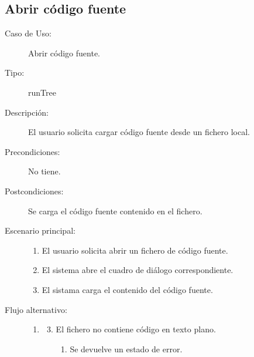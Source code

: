 \subsection{Abrir código fuente} 
\begin{framed}
\FloatBarrier
\begin{description}
   \item[Caso de Uso:] Abrir código fuente.
   \item [Tipo:] runTree
   \item[Descripción:] 
   El usuario solicita cargar código fuente desde un fichero local.
   \item[Precondiciones:]
   No tiene.
   \item[Postcondiciones:] 
   Se carga el código fuente contenido en el fichero.
   \item[Escenario principal:] \hfill
   \begin{enumerate}
   \item El usuario solicita abrir un fichero de código fuente.
   \item El sistema abre el cuadro de diálogo correspondiente.
   \item El sistama carga el contenido del código fuente.
   \end{enumerate}
    \item[Flujo alternativo:] \hfill 
   \begin{enumerate} \itemsep1pt \parskip0pt 
   \setcounter{enumi}{1}
   \renewcommand{\labelenumi}{}
   \renewcommand{\labelenumiii}{\arabic{enumiii}.}
   \renewcommand{\labelenumii}{\arabic{enumi}\alph{enumii}.}
      \item 
      \begin {enumerate}
         \setcounter{enumii}{2}
         \item El fichero no contiene código en texto plano.
         \begin{enumerate}
         \item Se devuelve un estado de error.
         \end{enumerate}
      \end{enumerate}
   \end{enumerate}
\end{description}
 \FloatBarrier
\end{framed}



